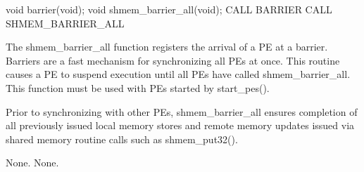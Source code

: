 \synC   %
 void barrier(void);
 void shmem_barrier_all(void);
\synF   %
 CALL BARRIER
 CALL SHMEM_BARRIER_ALL

{   
    The shmem\_barrier\_all function registers the arrival of a PE at a
    barrier. Barriers are a fast mechanism for synchronizing all PEs at
    once. This routine causes a PE to suspend execution until all PEs have
    called shmem\_barrier\_all. This function must be used with PEs started
    by start\_pes().

    Prior to synchronizing with other PEs, shmem\_barrier\_all ensures
    completion of all previously issued local memory stores and remote
    memory updates issued via shared memory routine calls such as
    shmem\_put32().
}
{
    \desTB{}{}
    {None.}
}
{None.}
\eAPI 
%
% 
% 
% 
% 
% 
% 
% 
% 
% 
% 
% 
% 
% 
% 
%        
